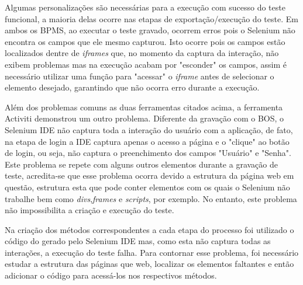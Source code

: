 \documentclass[12pt]{article}
\begin{document}
Algumas personalizações são necessárias para a execução com sucesso do teste funcional, a maioria delas ocorre nas etapas de exportação/execução do teste. Em ambos os BPMS, ao executar o teste gravado, ocorrem erros pois o Selenium não encontra os campos que ele mesmo capturou. Isto ocorre pois os campos estão localizados dentre de \emph{iframes} que, no momento da captura da interação, não exibem problemas mas na execução acabam por "esconder" os campos, assim é necessário utilizar uma função para "acessar" o \emph{iframe} antes de selecionar o elemento desejado, garantindo que não ocorra erro durante a execução.




Além dos problemas comuns as duas ferramentas citados acima, a ferramenta Activiti demonstrou um outro problema. Diferente da gravação com o BOS, o Selenium IDE não captura toda a interação do usuário com a aplicação, de fato, na etapa de login a IDE captura apenas o acesso a página e o "clique" ao botão de login, ou seja, não captura o preenchimento dos campos "Usuário" e "Senha". Este problema se repete com alguns outros elementos durante a gravação de teste, acredita-se que esse problema ocorra devido a estrutura da página web em questão, estrutura esta que pode conter elementos com os quais o Selenium não trabalhe bem como \emph{divs},\emph{frames} e \emph{scripts}, por exemplo. No entanto, este problema não impossibilita a criação e execução do teste.

Na criação dos métodos correspondentes a cada etapa do processo foi utilizado o código do gerado pelo Selenium IDE mas, como esta não captura todas as interações, a execução do teste falha. Para contornar esse problema, foi necessário estudar a estrutura das páginas que web, localizar os elementos faltantes e então adicionar o código para acessá-los nos respectivos métodos.
\end{document}
